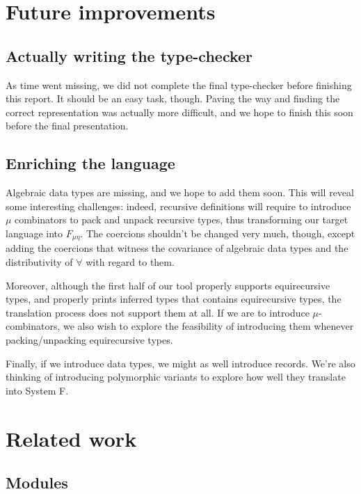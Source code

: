 \documentclass[10pt,a4paper,twoside,titlepage,twocolumn]{article}
\begin{document}
\section{Future improvements}

\subsection{Actually writing the type-checker}

As time went missing, we did not complete the final type-checker before
finishing this report. It should be an easy task, though. Paving the way and
finding the correct representation was actually more difficult, and we hope to
finish this soon before the final presentation.

\subsection{Enriching the language}

Algebraic data types are missing, and we hope to add them soon. This will reveal
some interesting challenges: indeed, recursive definitions will require to
introduce $\mu$ combinators to pack and unpack recursive types, thus
transforming our target language into $F_{\mu\eta}$. The coercions shouldn't be
changed very much, though, except adding the coercions that witness the
covariance of algebraic data types and the distributivity of $\forall$ with
regard to them.

Moreover, although the first half of our tool properly supports equirecursive
types, and properly prints inferred types that contains equirecursive types, the
translation process does not support them at all. If we are to introduce
$\mu$-combinators, we also wish to explore the feasibility of introducing them
whenever packing/unpacking equirecursive types.

Finally, if we introduce data types, we might as well introduce records. We're
also thinking of introducing polymorphic variants to explore how well they
translate into System F.

\section{Related work}

\subsection{Modules}
\end{document}

